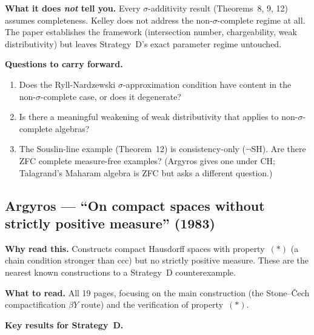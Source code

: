 \medskip\noindent
\textbf{What it does \emph{not} tell you.}  Every $\sigma$-additivity
result (Theorems~8, 9, 12) assumes completeness.  Kelley does not
address the non-$\sigma$-complete regime at all.  The paper
establishes the framework (intersection number, chargeability,
weak distributivity) but leaves Strategy~D's exact parameter regime
untouched.

\medskip\noindent
\textbf{Questions to carry forward.}
\begin{enumerate}[nosep]
  \item Does the Ryll-Nardzewski $\sigma$-approximation condition
    have content in the non-$\sigma$-complete case, or does it
    degenerate?
  \item Is there a meaningful weakening of weak distributivity that
    applies to non-$\sigma$-complete algebras?
  \item The Souslin-line example (Theorem~12) is consistency-only
    ($\neg$SH).  Are there ZFC complete measure-free examples?
    (Argyros gives one under CH; Talagrand's Maharam algebra is
    ZFC but asks a different question.)
\end{enumerate}

\subsection*{Argyros --- ``On compact spaces without strictly
  positive measure'' (1983)}

\textbf{Why read this.}  Constructs compact Hausdorff spaces with
property~$(*)$ (a chain condition stronger than ccc) but no strictly
positive measure.  These are the nearest known constructions to a
Strategy~D counterexample.

\medskip\noindent
\textbf{What to read.}  All 19 pages, focusing on the main
construction (the Stone--\v{C}ech compactification $\beta Y$
route) and the verification of property~$(*)$.

\medskip\noindent
\textbf{Key results for Strategy~D.}

